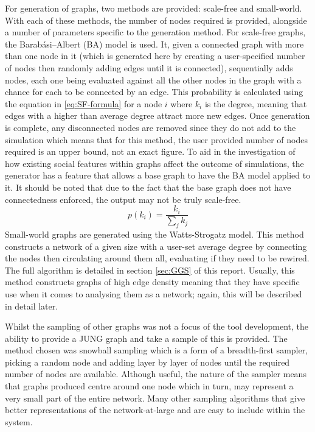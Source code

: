 \documentclass[]{report}
\begin{document}
For generation of graphs, two methods are provided: scale-free and small-world. With each of these methods, the number of nodes required is provided, alongside a number of parameters specific to the generation method. For scale-free graphs, the Barabási–Albert (BA) model is used\cite{BAStat}. It, given a connected graph with more than one node in it (which is generated here by creating a user-specified number of nodes then randomly adding edges until it is connected), sequentially adds nodes, each one being evaluated against all the other nodes in the graph with a chance for each to be connected by an edge. This probability is calculated using the equation in \ref{eq:SF-formula} for a node $i$ where $k_{i}$ is the degree, meaning that edges with a higher than average degree attract more new edges. Once generation is complete, any disconnected nodes are removed since they do not add to the simulation which means that for this method, the user provided number of nodes required is an upper bound, not an exact figure. To aid in the investigation of how existing social features within graphs affect the outcome of simulations, the generator has a feature that allows a base graph to have the BA model applied to it. It should be noted that due to the fact that the base graph does not have connectedness enforced, the output may not be truly scale-free. 
\begin{equation}
\label{eq:SF-formula}
p(k_{i}) = \frac{k_{i}}{\sum\limits_{j}k_{j}}
\end{equation}
Small-world graphs are generated using the Watts-Strogatz model\cite{BAStat}. This method constructs a network of a given size with a user-set average degree by connecting the nodes then circulating around them all, evaluating if they need to be rewired. The full algorithm is detailed in section \ref{sec:GGS} of this report. Usually, this method constructs graphs of high edge density meaning that they have specific use when it comes to analysing them as a network; again, this will be described in detail later.

Whilst the sampling of other graphs was not a focus of the tool development, the ability to provide a JUNG graph and take a sample of this is provided. The method chosen was snowball sampling which is a form of a breadth-first sampler, picking a random node and adding layer by layer of nodes until the required number of nodes are available\cite{snowball}. Although useful, the nature of the sampler means that graphs produced centre around one node which in turn, may represent a very small part of the entire network. Many other sampling algorithms that give better representations of the network-at-large and are easy to include within the system.
\end{document}
